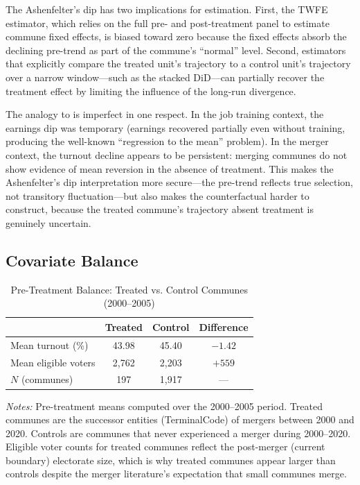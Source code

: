 \documentclass[12pt]{article}
\begin{document}
The Ashenfelter's dip has two implications for estimation. First, the TWFE estimator, which relies on the full pre- and post-treatment panel to estimate commune fixed effects, is biased toward zero because the fixed effects absorb the declining pre-trend as part of the commune's ``normal'' level. Second, estimators that explicitly compare the treated unit's trajectory to a control unit's trajectory over a narrow window---such as the stacked DiD---can partially recover the treatment effect by limiting the influence of the long-run divergence.

The analogy to \citet{ashenfelter1978estimating} is imperfect in one respect. In the job training context, the earnings dip was temporary (earnings recovered partially even without training, producing the well-known ``regression to the mean'' problem). In the merger context, the turnout decline appears to be persistent: merging communes do not show evidence of mean reversion in the absence of treatment. This makes the Ashenfelter's dip interpretation more secure---the pre-trend reflects true selection, not transitory fluctuation---but also makes the counterfactual harder to construct, because the treated commune's trajectory absent treatment is genuinely uncertain.

\subsection{Covariate Balance}

\begin{table}[H]
    \centering
    \caption{Pre-Treatment Balance: Treated vs. Control Communes (2000--2005)}
    \begin{threeparttable}
    \begin{tabular}{lccc}
        \toprule
        & Treated & Control & Difference \\
        \midrule
        Mean turnout (\%) & 43.98 & 45.40 & $-1.42$ \\
        Mean eligible voters & 2,762 & 2,203 & $+559$ \\
        $N$ (communes) & 197 & 1,917 & --- \\
        \bottomrule
    \end{tabular}
    \begin{tablenotes}[flushleft]
    \small
    \item \textit{Notes:} Pre-treatment means computed over the 2000--2005 period. Treated communes are the successor entities (TerminalCode) of mergers between 2000 and 2020. Controls are communes that never experienced a merger during 2000--2020. Eligible voter counts for treated communes reflect the post-merger (current boundary) electorate size, which is why treated communes appear larger than controls despite the merger literature's expectation that small communes merge.
    \end{tablenotes}
    \end{threeparttable}
    \label{tab:balance}
\end{table}
\end{document}

